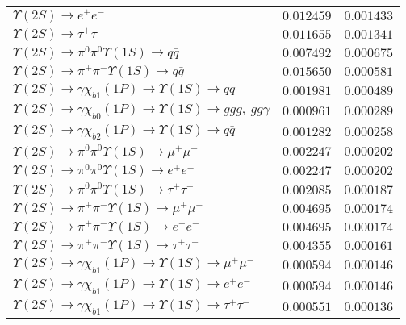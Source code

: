 \documentclass[12pt]{article}
\begin{document}
\begin{tabular}{p{4.7in} l l}
$   \Upsilon(2S) \to e^+ e^-                                                   $ & $   0.012459       $ & $   0.001433     $ \\ 
$   \Upsilon(2S) \to \tau^+ \tau^-                                             $ & $   0.011655      $ & $   0.001341     $ \\ 
$   \Upsilon(2S) \to \pi^0 \pi^0 \Upsilon(1S) \to q\bar{q}                     $ & $   0.007492       $ & $   0.000675      $ \\ 
$   \Upsilon(2S) \to \pi^+ \pi^- \Upsilon(1S) \to q\bar{q}                     $ & $   0.015650      $ & $   0.000581     $ \\ 
$   \Upsilon(2S) \to \gamma \chi_{b1}(1P) \to \Upsilon(1S) \to q\bar{q}        $ & $   0.001981     $ & $   0.000489     $ \\ 
$   \Upsilon(2S) \to \gamma \chi_{b0}(1P) \to \Upsilon(1S) \to ggg,\ gg\gamma   $ & $   0.000961     $ & $   0.000289    $ \\ 
$   \Upsilon(2S) \to \gamma \chi_{b2}(1P) \to \Upsilon(1S) \to q\bar{q}        $ & $   0.001282     $ & $   0.000258     $ \\ 
$   \Upsilon(2S) \to \pi^0 \pi^0 \Upsilon(1S) \to \mu^+ \mu^-                  $ & $   0.002247      $ & $   0.000202    $ \\ 
$   \Upsilon(2S) \to \pi^0 \pi^0 \Upsilon(1S) \to e^+ e^-                      $ & $   0.002247      $ & $   0.000202    $ \\ 
$   \Upsilon(2S) \to \pi^0 \pi^0 \Upsilon(1S) \to \tau^+ \tau^-                $ & $   0.002085     $ & $   0.000187    $ \\ 
$   \Upsilon(2S) \to \pi^+ \pi^- \Upsilon(1S) \to \mu^+ \mu^-                  $ & $   0.004695      $ & $   0.000174    $ \\ 
$   \Upsilon(2S) \to \pi^+ \pi^- \Upsilon(1S) \to e^+ e^-                      $ & $   0.004695      $ & $   0.000174    $ \\ 
$   \Upsilon(2S) \to \pi^+ \pi^- \Upsilon(1S) \to \tau^+ \tau^-                $ & $   0.004355      $ & $   0.000161    $ \\ 
$   \Upsilon(2S) \to \gamma \chi_{b1}(1P) \to \Upsilon(1S) \to \mu^+ \mu^-     $ & $   0.000594     $ & $   0.000146    $ \\ 
$   \Upsilon(2S) \to \gamma \chi_{b1}(1P) \to \Upsilon(1S) \to e^+ e^-         $ & $   0.000594     $ & $   0.000146    $ \\ 
$   \Upsilon(2S) \to \gamma \chi_{b1}(1P) \to \Upsilon(1S) \to \tau^+ \tau^-   $ & $   0.000551     $ & $   0.000136     $ \\ 

\end{tabular}
\end{document}
